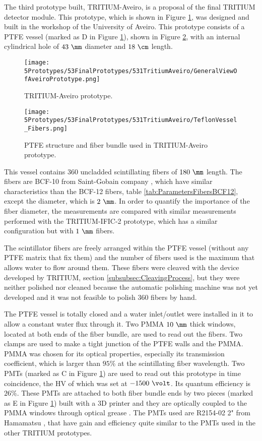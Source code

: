 The third prototype built, TRITIUM-Aveiro, is a proposal of the final TRITIUM detector module. This prototype, which is shown in Figure \ref{fig:TritiumAveiro0}, was designed and built in the workshop of the University of Aveiro. This prototype consists of a PTFE vessel (marked as D in Figure \ref{fig:TritiumAveiro0}), shown in Figure \ref{fig:TeflonStructureFibersTritiumAveiro0}, with an internal cylindrical hole of $43~\mm$ diameter and $18~\cm$ length.

\begin{figure}[h]
\centering
\texttt{[image: 5Prototypes/53FinalPrototypes/531TritiumAveiro/GeneralViewOfAveiroPrototype.png]}
\caption{TRITIUM-Aveiro prototype.\label{fig:TritiumAveiro0}}
\end{figure}
 
\begin{figure}[h]
\centering
\texttt{[image: 5Prototypes/53FinalPrototypes/531TritiumAveiro/TeflonVessel\_Fibers.png]}
\caption{PTFE structure and fiber bundle used in TRITIUM-Aveiro prototype.\label{fig:TeflonStructureFibersTritiumAveiro0}}
\end{figure}
This vessel contains $360$ uncladded scintillating fibers of $180~\mm$ length. The fibers are BCF-10 from Saint-Gobain company \cite{DataSheetBCF10Fiber}, which have similar characteristics than the BCF-12 fibers, table \ref{tab:ParametersFibersBCF12}, except the diameter, which is $2~\mm$. In order to quantify the importance of the fiber diameter, the measurements are compared with similar measurements performed with the TRITIUM-IFIC-2 prototype, which has a similar configuration but with $1~\mm$ fibers.

The scintillator fibers are freely arranged within the PTFE vessel (without any PTFE matrix that fix them) and the number of fibers used is the maximum that allows water to flow around them. These fibers were cleaved with the device developed by TRITIUM, section \ref{subsubsec:CleavingProcess}, but they were neither polished nor cleaned because the automatic polishing machine was not yet developed and it was not feasible to polish 360 fibers by hand. 

The PTFE vessel is totally closed and  a water inlet/outlet were installed in it to allow a constant water flux through it. Two PMMA $10~\mm$ thick windows, located at both ends of the fiber bundle, are used to read out the fibers. Two clamps are used to make a tight junction of the PTFE walls and the PMMA. PMMA was chosen for its optical properties, especially its transmission coefficient, which is larger than $95\%$ at the scintillating fiber wavelength. Two PMTs (marked as C in Figure \ref{fig:TritiumAveiro0}) are used to read out this prototype in time coincidence, the HV of which was set at $-1500~\volt$. Its quantum efficiency is $26\%$. These PMTs are attached to both fiber bundle ends by two pieces (marked as E in Figure \ref{fig:TritiumAveiro0}) built with a 3D printer and they are optically coupled to the PMMA windows through optical grease \cite{OpticalGrease}. The PMTs used are R2154-02 2" from Hamamatsu \cite{DataSheetPMTsAveiro}, that have gain and efficiency quite similar to the PMTs used in the other TRITIUM prototypes.

